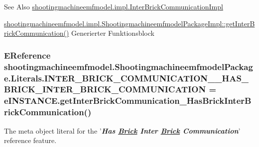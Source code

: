 \begin{DoxySeeAlso}{See Also}
\hyperlink{classshootingmachineemfmodel_1_1impl_1_1_inter_brick_communication_impl}{shootingmachineemfmodel.\-impl.\-Inter\-Brick\-Communication\-Impl} 

\hyperlink{classshootingmachineemfmodel_1_1impl_1_1_shootingmachineemfmodel_package_impl_a6dcf03b9cd465e27248a0278c6e55f11}{shootingmachineemfmodel.\-impl.\-Shootingmachineemfmodel\-Package\-Impl\-::get\-Inter\-Brick\-Communication()} Generierter Funktionsblock 
\end{DoxySeeAlso}
\hypertarget{interfaceshootingmachineemfmodel_1_1_shootingmachineemfmodel_package_1_1_literals_ae2037a67c79323fb6399ef6bd81e834d}{
\subsubsection[{I\-N\-T\-E\-R\-\_\-\-B\-R\-I\-C\-K\-\_\-\-C\-O\-M\-M\-U\-N\-I\-C\-A\-T\-I\-O\-N\-\_\-\-\_\-\-H\-A\-S\-\_\-\-B\-R\-I\-C\-K\-\_\-\-I\-N\-T\-E\-R\-\_\-\-B\-R\-I\-C\-K\-\_\-\-C\-O\-M\-M\-U\-N\-I\-C\-A\-T\-I\-O\-N}]{\setlength{\rightskip}{0pt plus 5cm}E\-Reference shootingmachineemfmodel.\-Shootingmachineemfmodel\-Package.\-Literals.\-I\-N\-T\-E\-R\-\_\-\-B\-R\-I\-C\-K\-\_\-\-C\-O\-M\-M\-U\-N\-I\-C\-A\-T\-I\-O\-N\-\_\-\-\_\-\-H\-A\-S\-\_\-\-B\-R\-I\-C\-K\-\_\-\-I\-N\-T\-E\-R\-\_\-\-B\-R\-I\-C\-K\-\_\-\-C\-O\-M\-M\-U\-N\-I\-C\-A\-T\-I\-O\-N = e\-I\-N\-S\-T\-A\-N\-C\-E.\-get\-Inter\-Brick\-Communication\-\_\-\-Has\-Brick\-Inter\-Brick\-Communication()}}\label{interfaceshootingmachineemfmodel_1_1_shootingmachineemfmodel_package_1_1_literals_ae2037a67c79323fb6399ef6bd81e834d}
The meta object literal for the '{\itshape {\bfseries Has \hyperlink{interfaceshootingmachineemfmodel_1_1_brick}{Brick} Inter \hyperlink{interfaceshootingmachineemfmodel_1_1_brick}{Brick} Communication}}' reference feature.

